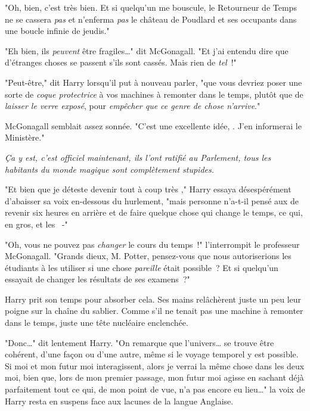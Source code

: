 "Oh, bien, c'est très bien. Et si quelqu'un me bouscule, le Retourneur de Temps ne se cassera \emph{pas} et n'enferma \emph{pas} le château de Poudlard et ses occupants dans une boucle infinie de jeudis."

"Eh bien, ils \emph{peuvent} être fragiles…" dit McGonagall. "Et j'ai entendu dire que d'étranges choses se passent s'ils sont cassés. Mais rien de \emph{tel}~!"

"Peut-être," dit Harry lorsqu'il put à nouveau parler, "que vous devriez poser une sorte de \emph{coque protectrice} à vos machines à remonter dans le temps, plutôt que de \emph{laisser le verre exposé}, pour \emph{empêcher que ce genre de chose n'arrive}."

McGonagall semblait assez sonnée. "C'est une excellente idée, . J'en informerai le Ministère."

\emph{Ça y est, c'est officiel maintenant, ils l'ont ratifié au Parlement, tous les habitants du monde magique sont complètement stupides.}

"Et bien que je déteste devenir tout à coup très ," Harry essaya désespérément d'abaisser sa voix en-dessous du hurlement, "mais personne n'a-t-il pensé aux  de revenir six heures en arrière et de faire quelque chose qui change le temps, ce qui, en gros,  et les ~-"

"Oh, vous ne pouvez pas \emph{changer} le cours du temps~!" l'interrompit le professeur McGonagall. "Grands dieux, M. Potter, pensez-vous que nous autoriserions les étudiants à les utiliser si une chose \emph{pareille} était possible~? Et si quelqu'un essayait de changer les résultats de ses examens~?"

Harry prit son temps pour absorber cela. Ses mains relâchèrent juste un peu leur poigne sur la chaîne du sablier. Comme s'il ne tenait pas une machine à remonter dans le temps, juste une tête nucléaire enclenchée.

"Donc…" dit lentement Harry. "On remarque que l'univers… se trouve être cohérent, d'une façon ou d'une autre, même si le voyage temporel y est possible. Si moi et mon futur moi interagissent, alors je verrai la même chose dans les deux moi, bien que, lors de mon premier passage, mon futur moi agisse en sachant déjà parfaitement tout ce qui, de mon point de vue, n'a pas encore eu lieu…" la voix de Harry resta en suspens face aux lacunes de la langue Anglaise.

